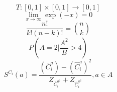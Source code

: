 \documentclass[12pt, a4paper]{article}
\begin{document}
\begin{equation}
T : [0,1] \times [0,1] \rightarrow [0,1]
\end{equation}
\begin{equation}
\lim_{x \rightarrow \infty} \exp(-x) = 0
\end{equation}
\begin{equation}
\frac{n!}{k!(n-k)!} = {n \choose k}
\end{equation}
\begin{equation}
P \left( A=2 \bigg| \frac{A^2}{B} > 4 \right)
\end{equation}
\begin{equation}
S^{C_i}(a) = \frac{(\bar{C}^{a}_i) - (\hat{C}^{a}_i)^2}{Z_{\bar{C}^{a^2}_i} + Z_{\hat{C}^{a^2}_i}}, a \in A
\end{equation}
\end{document}
